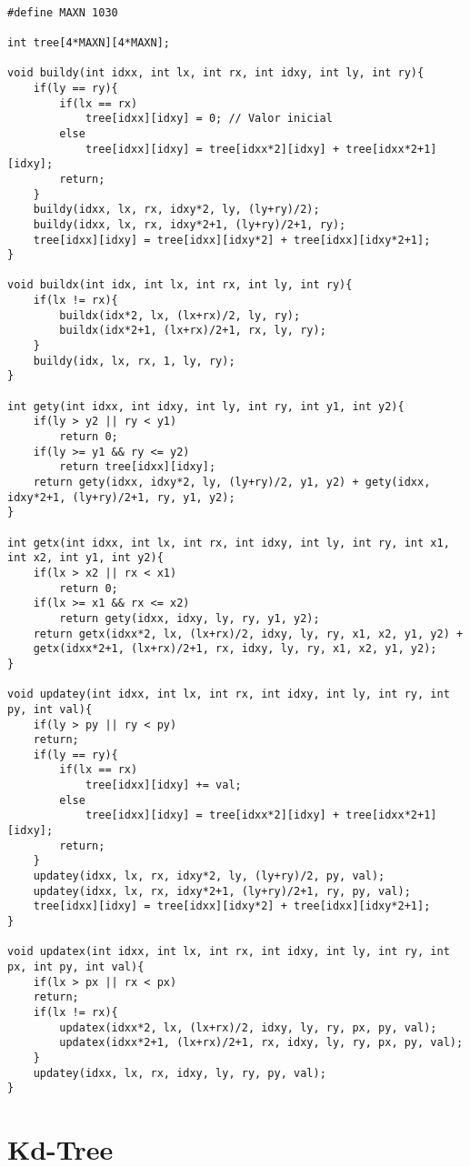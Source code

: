 \begin{multicols}{2}
	\begin{lstlisting}

#define MAXN 1030

int tree[4*MAXN][4*MAXN];

void buildy(int idxx, int lx, int rx, int idxy, int ly, int ry){
	if(ly == ry){
		if(lx == rx)
			tree[idxx][idxy] = 0; // Valor inicial
		else
			tree[idxx][idxy] = tree[idxx*2][idxy] + tree[idxx*2+1][idxy];
		return;
	}
	buildy(idxx, lx, rx, idxy*2, ly, (ly+ry)/2);
	buildy(idxx, lx, rx, idxy*2+1, (ly+ry)/2+1, ry);
	tree[idxx][idxy] = tree[idxx][idxy*2] + tree[idxx][idxy*2+1];
}

void buildx(int idx, int lx, int rx, int ly, int ry){
	if(lx != rx){
		buildx(idx*2, lx, (lx+rx)/2, ly, ry);
		buildx(idx*2+1, (lx+rx)/2+1, rx, ly, ry);
	}
	buildy(idx, lx, rx, 1, ly, ry);
}

int gety(int idxx, int idxy, int ly, int ry, int y1, int y2){
	if(ly > y2 || ry < y1)
		return 0;
	if(ly >= y1 && ry <= y2)
		return tree[idxx][idxy];
	return gety(idxx, idxy*2, ly, (ly+ry)/2, y1, y2) + gety(idxx, idxy*2+1, (ly+ry)/2+1, ry, y1, y2);
}

int getx(int idxx, int lx, int rx, int idxy, int ly, int ry, int x1, int x2, int y1, int y2){
	if(lx > x2 || rx < x1)
		return 0;
	if(lx >= x1 && rx <= x2)
		return gety(idxx, idxy, ly, ry, y1, y2);
	return getx(idxx*2, lx, (lx+rx)/2, idxy, ly, ry, x1, x2, y1, y2) +
	getx(idxx*2+1, (lx+rx)/2+1, rx, idxy, ly, ry, x1, x2, y1, y2);
}

void updatey(int idxx, int lx, int rx, int idxy, int ly, int ry, int py, int val){
	if(ly > py || ry < py)
	return;
	if(ly == ry){
		if(lx == rx)
			tree[idxx][idxy] += val;
		else
			tree[idxx][idxy] = tree[idxx*2][idxy] + tree[idxx*2+1][idxy];
		return;
	}
	updatey(idxx, lx, rx, idxy*2, ly, (ly+ry)/2, py, val);
	updatey(idxx, lx, rx, idxy*2+1, (ly+ry)/2+1, ry, py, val);
	tree[idxx][idxy] = tree[idxx][idxy*2] + tree[idxx][idxy*2+1];
}

void updatex(int idxx, int lx, int rx, int idxy, int ly, int ry, int px, int py, int val){
	if(lx > px || rx < px)
	return;
	if(lx != rx){
		updatex(idxx*2, lx, (lx+rx)/2, idxy, ly, ry, px, py, val);
		updatex(idxx*2+1, (lx+rx)/2+1, rx, idxy, ly, ry, px, py, val);
	}
	updatey(idxx, lx, rx, idxy, ly, ry, py, val);
}

	\end{lstlisting}
\end{multicols}
\section{Kd-Tree}


